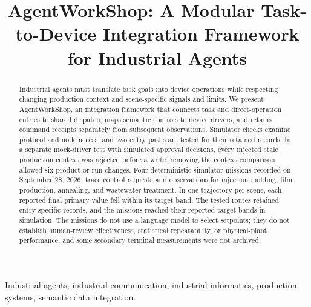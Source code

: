 \documentclass[journal]{IEEEtran}
\begin{document}

\title{AgentWorkShop: A Modular Task-to-Device Integration Framework for Industrial Agents}

\author{}

\maketitle

\begin{abstract}
Industrial agents must translate task goals into device operations while
respecting changing production context and scene-specific signals and limits.
We present AgentWorkShop, an integration framework that connects task and
direct-operation entries to shared dispatch, maps semantic controls to device
drivers, and retains command receipts separately from subsequent observations.
Simulator checks examine protocol and node access, and two entry paths are
tested for their retained records. In a separate mock-driver test with
simulated approval decisions, every injected stale production context was
rejected before a write; removing the context comparison allowed six product
or run changes. Four deterministic simulator missions recorded on September
28, 2026, trace control requests and observations for injection molding, film
production, annealing, and wastewater treatment. In one trajectory per scene,
each reported final primary value fell within its target band. The tested
routes retained entry-specific records, and the missions reached their reported
target bands in simulation. The missions do not use a
language model to select setpoints; they do not establish human-review
effectiveness, statistical repeatability, or physical-plant performance, and
some secondary terminal measurements were not archived.
\end{abstract}

\begin{IEEEkeywords}
Industrial agents, industrial communication, industrial informatics,
production systems, semantic data integration.
\end{IEEEkeywords}

\IEEEpeerreviewmaketitle








\clearpage
\balance


\end{document}
